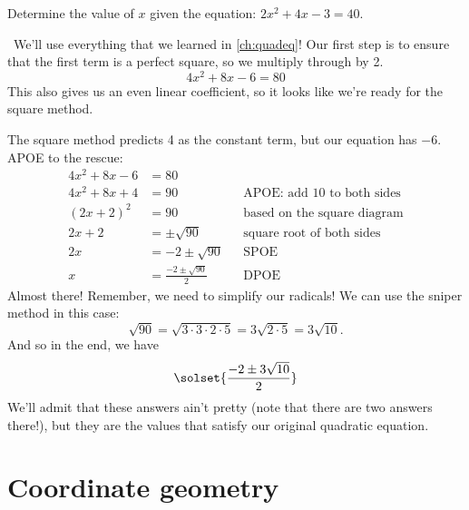 \begin{boxedex}
Determine the value of $x$ given the equation: $2x^2+4x-3=40$.

\exsoln\ We'll use everything that we learned in \cref{ch:quadeq}! Our first step is to ensure that the first term is a perfect square, so we multiply through by 2.
\[4x^2 + 8x - 6 = 80\]
This also gives us an even linear coefficient, so it looks like we're ready for the square method.
\begin{center}
\end{center}
The square method predicts 4 as the constant term, but our equation has $-6$. APOE to the rescue:
\begin{align*}
4x^2 + 8x - 6 &= 80
\\
4x^2 + 8x + 4 &= 90
&&\text{APOE: add 10 to both sides}
\\
(2x+2)^2 &= 90
&&\text{based on the square diagram}
\\
2x+2 &= \pm\sqrt{90}
&&\text{square root of both sides}
\\
2x &= -2 \pm\sqrt{90}
&&\text{SPOE}
\\[1ex]
x &= \frac{-2 \pm\sqrt{90}}{2}
&&\text{DPOE}
\end{align*}
Almost there! Remember, we need to simplify our radicals! We can use the sniper method in this case:
\[\sqrt{90} = \sqrt{3\cdot3\cdot2\cdot5} = 3\sqrt{2\cdot5} = 3\sqrt{10}.\]
And so in the end, we have
\[\solset{\frac{-2 \pm 3\sqrt{10}}{2}}\]
We'll admit that these answers ain't pretty (note that there are two answers there!), but they are the values that satisfy our original quadratic equation.
\end{boxedex}

\section{Coordinate geometry}
\label{sec:coordgeometry}

